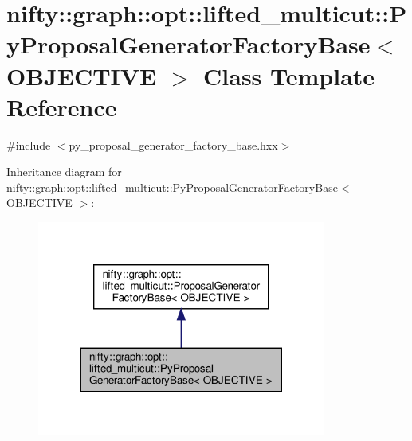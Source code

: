 \hypertarget{classnifty_1_1graph_1_1opt_1_1lifted__multicut_1_1PyProposalGeneratorFactoryBase}{}\section{nifty\+:\+:graph\+:\+:opt\+:\+:lifted\+\_\+multicut\+:\+:Py\+Proposal\+Generator\+Factory\+Base$<$ O\+B\+J\+E\+C\+T\+I\+VE $>$ Class Template Reference}
\label{classnifty_1_1graph_1_1opt_1_1lifted__multicut_1_1PyProposalGeneratorFactoryBase}


{\ttfamily \#include $<$py\+\_\+proposal\+\_\+generator\+\_\+factory\+\_\+base.\+hxx$>$}



Inheritance diagram for nifty\+:\+:graph\+:\+:opt\+:\+:lifted\+\_\+multicut\+:\+:Py\+Proposal\+Generator\+Factory\+Base$<$ O\+B\+J\+E\+C\+T\+I\+VE $>$\+:
\nopagebreak
\begin{figure}[H]
\begin{center}
\leavevmode
\includegraphics[width=269pt]{classnifty_1_1graph_1_1opt_1_1lifted__multicut_1_1PyProposalGeneratorFactoryBase__inherit__graph}
\end{center}
\end{figure}


